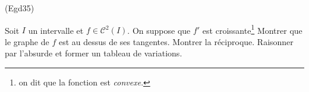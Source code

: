 \begin{tiny}(Egd35)\end{tiny} Soit $I$ un intervalle et $f\in \mathcal{C}^2(I)$. On suppose que $f'$ est croissante\footnote{on dit que la fonction est \emph{convexe}.} Montrer que le graphe de $f$ est au dessus de ses tangentes. Montrer la réciproque. Raisonner par l'absurde et former un tableau de variations.  